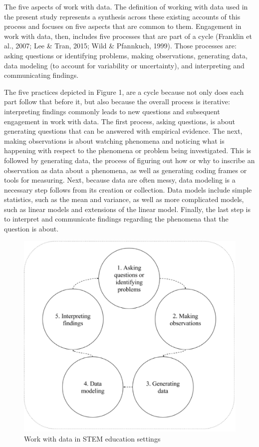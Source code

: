 \documentclass[]{msu-thesis}
\theoremstyle{definition}
\theoremstyle{definition}
\theoremstyle{definition}
\theoremstyle{remark}
\begin{document}
The five aspects of work with data. The definition of working with data
used in the present study represents a synthesis across these existing
accounts of this process and focuses on five aspects that are common to
them. Engagement in work with data, then, includes five processes that
are part of a cycle (Franklin et al., 2007; Lee \& Tran, 2015; Wild \&
Pfannkuch, 1999). Those processes are: asking questions or identifying
problems, making observations, generating data, data modeling (to
account for variability or uncertainty), and interpreting and
communicating findings.

The five practices depicted in Figure 1, are a cycle because not only
does each part follow that before it, but also because the overall
process is iterative: interpreting findings commonly leads to new
questions and subsequent engagement in work with data. The first
process, asking questions, is about generating questions that can be
answered with empirical evidence. The next, making observations is about
watching phenomena and noticing what is happening with respect to the
phenomena or problem being investigated. This is followed by generating
data, the process of figuring out how or why to inscribe an observation
as data about a phenomena, as well as generating coding frames or tools
for measuring. Next, because data are often messy, data modeling is a
necessary step follows from its creation or collection. Data models
include simple statistics, such as the mean and variance, as well as
more complicated models, such as linear models and extensions of the
linear model. Finally, the last step is to interpret and communicate
findings regarding the phenomena that the question is about.

\begin{figure}

{\centering \includegraphics[width=0.8\linewidth]{images/figure1} 

}

\caption{Work with data in STEM education settings}\label{fig:unnamed-chunk-1}
\end{figure}
\end{document}
